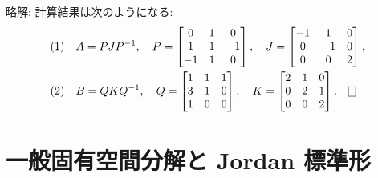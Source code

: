 \documentclass[12pt,twoside]{jarticle}
\newcommand\commentout[1]{#1}
\newcommand\commentout[1]{}
\begin{document}
\commentout{
\medskip\noindent
略解: 計算結果は次のようになる:
\begin{align*}
  &
  \text{(1)} \quad
  A = PJP^{-1},
  \quad
  P =
  \begin{bmatrix}
     0 &  1 &  0 \\
     1 &  1 & -1 \\
    -1 &  1 &  0 \\
  \end{bmatrix},
  \quad
  J = 
  \begin{bmatrix}
    -1 &  1 &  0 \\
     0 & -1 &  0 \\
     0 &  0 &  2 \\
  \end{bmatrix},
  \\ &
  \text{(2)} \quad
  B = QKQ^{-1},
  \quad
  Q =
  \begin{bmatrix}
    1 & 1 & 1 \\
    3 & 1 & 0 \\
    1 & 0 & 0 \\
  \end{bmatrix},
  \quad
  K = 
  \begin{bmatrix}
    2 & 1 & 0 \\
    0 & 2 & 1 \\
    0 & 0 & 2 \\
  \end{bmatrix}.
  \qed
\end{align*}
}


\section{一般固有空間分解と Jordan 標準形}
\label{sec:Jordan-nilpotent}
\end{document}
